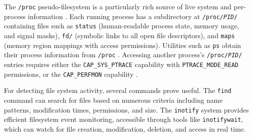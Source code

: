 The \texttt{/proc} pseudo-filesystem is a particularly rich source of live system and per-process information \parencite{KernelProc}. Each running process has a subdirectory at \texttt{/proc/\textit{PID}/} containing files such as \texttt{status} (human-readable process state, memory usage, and signal masks), \texttt{fd/} (symbolic links to all open file descriptors), and \texttt{maps} (memory region mappings with access permissions). Utilities such as \texttt{ps} obtain their process information from \texttt{/proc} \parencite{KernelProc}. Accessing another process's \texttt{/proc/\textit{PID}/} entries requires either the \texttt{CAP\_SYS\_PTRACE} capability with \texttt{PTRACE\_MODE\_READ} permissions, or the \texttt{CAP\_PERFMON} capability \parencite{KernelProc}.

For detecting file system activity, several commands prove useful. The \texttt{find} command can search for files based on numerous criteria including name patterns, modification times, permissions, and size. The \texttt{inotify} system provides efficient filesystem event monitoring, accessible through tools like \texttt{inotifywait}, which can watch for file creation, modification, deletion, and access in real time.

